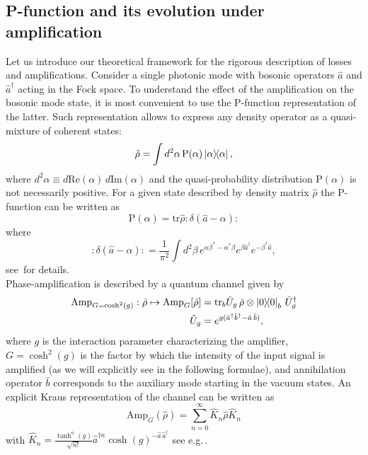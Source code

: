 \documentclass[a4paper]{article}
\newcommand{\prjct}[1]{\mathinner{|{#1}\rangle}\!\!\mathinner{\langle{#1}|}}
\newcommand{\tr}{\text{tr}}
\renewcommand{\t}[1]{\mathrm{#1}}
\newcommand{\be}{\begin{equation}}
\newcommand{\ee}{\end{equation}}
\begin{document}
\subsection{P-function and its evolution under amplification}

Let us introduce our theoretical framework for the rigorous description of losses and amplifications.
Consider a single photonic mode with bosonic operators $\hat a$ and $\hat a^\dag$ acting in the Fock space.
To understand the effect of the amplification on the bosonic mode state, it is most convenient to use the P-function representation of the latter. 
Such representation allows to express any density operator as a quasi-mixture of coherent states:
\be
\hat{\rho} = \int d^2 \alpha \, \t{P}(\alpha) \prjct{\alpha},
\label{P-representation}
\ee
where $d^2 \alpha\equiv d\text{Re}(\alpha)\,d\text{Im}(\alpha)$ and the quasi-probability distribution $\t{P}(\alpha)$ is not necessarily positive.
For a given state described by density matrix $\hat\rho$ the P-function can be written as 
\be
\t{P}(\alpha) = \tr \hat{\rho} :\delta(\hat a-\alpha):
\ee
where
\be
:\delta(\hat a-\alpha): = \frac{1}{\pi^2}\int d^2\beta\,  e^{\alpha \beta^* - \alpha^* \beta} e^{\beta \hat a^\dag} e^{-\beta^* \hat a},
\ee
see\,\cite{Vogel} for details.\\ 

Phase-amplification is described by a quantum channel given by
\be\begin{split}
    \t{Amp}_{G=\cosh^2(g)}: \hat{\rho} \mapsto \t{Amp}_{G}[\hat{\rho}]&=\tr_b \hat{U}_g\,   \hat{\rho} \otimes \prjct{0}_b\, \hat{U}_g^\dag\\
    \hat{U}_g &= e^{g (\hat{a}^\dag \hat{b}^\dag - \hat{a} \, \hat{b})},
\end{split}
\ee
where $g$ is the interaction parameter characterizing the amplifier, $G = \cosh^2(g)$ is the factor by which the intensity of the input signal is amplified (as we will explicitly see in the following formulae), and annihilation operator $\hat b$ corresponds to the auxiliary mode starting in the vacuum states.
An explicit Kraus representation of the channel can be written as
\be
\t{Amp}_{G}(\hat{\rho}) =\sum_{n=0}^\infty \hat{K}_n \hat{\rho} \hat{K}_n
\ee
with $\hat{K}_n = \frac{\tanh^{n}(g)}{\sqrt{n!}} \hat{a}^{\dag n} \cosh(g)^{-\hat{a}\, \hat{a}^\dag}$ see e.g.\,\cite{Sekatski}.
\end{document}
